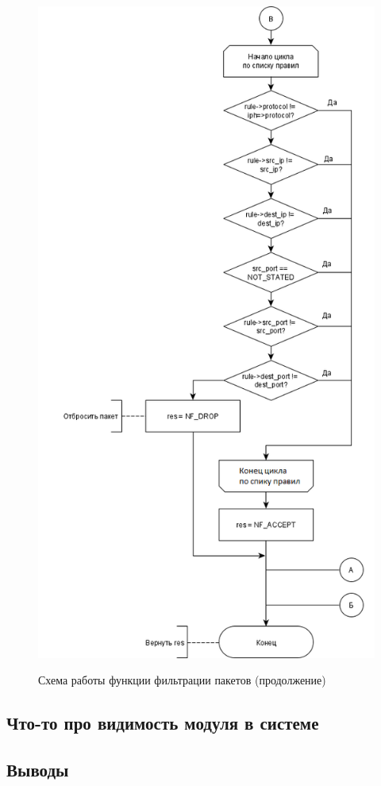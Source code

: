 \begin{figure}[p]
	\begin{center}
		{\includegraphics[scale = 0.8]{img/filter2.png}}
		\caption{Схема работы функции фильтрации пакетов (продолжение)}
		\label{fig8:image}
	\end{center}
\end{figure}

\newpage


\subsection{Что-то про видимость модуля в системе}

\subsection{Выводы}
